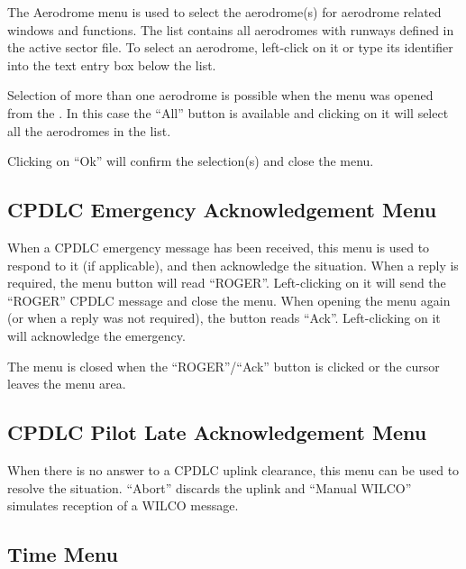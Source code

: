 \documentclass[a4paper,oneside,11pt]{memoir}
\begin{document}
The Aerodrome menu is used to select the aerodrome(s) for aerodrome related windows and functions. The list contains all aerodromes with runways defined in the active sector file. To select an aerodrome, left-click on it or type its identifier into the text entry box below the list.

\bigskip

Selection of more than one aerodrome is possible when the menu was opened from the . In this case the “All” button is available and clicking on it will select all the aerodromes in the list.

\bigskip

Clicking on “Ok” will confirm the selection(s) and close the menu.

\subsection{CPDLC Emergency Acknowledgement Menu}
\label{menu:dleam}

When a CPDLC emergency message has been received, this menu is used to respond to it (if applicable), and then acknowledge the situation. When a reply is required, the menu button will read “ROGER”. Left-clicking on it will send the “ROGER” CPDLC message and close the menu. When opening the menu again (or when a reply was not required), the button reads “Ack”. Left-clicking on it will acknowledge the emergency. 

\bigskip

The menu is closed when the “ROGER”/“Ack” button is clicked or the cursor leaves the menu area.

\subsection{CPDLC Pilot Late Acknowledgement Menu}
\label{menu:dlplam}

When there is no answer to a CPDLC uplink clearance, this menu can be used to resolve the situation. “Abort” discards the uplink and “Manual WILCO” simulates reception of a WILCO message.

\subsection{Time Menu}
\label{menu:tm}
\end{document}
